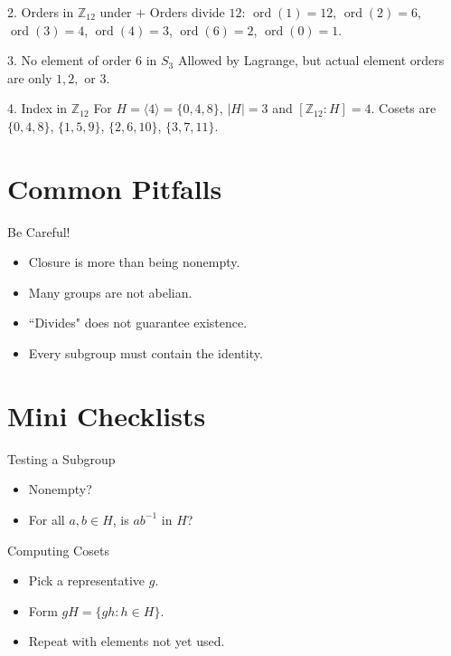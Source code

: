 \documentclass[12pt]{article}
\begin{document}
\begin{examplebox}{2. Orders in $\mathbb{Z}_{12}$ under $+$}
Orders divide $12$: $\operatorname{ord}(1)=12$, $\operatorname{ord}(2)=6$, $\operatorname{ord}(3)=4$, $\operatorname{ord}(4)=3$, $\operatorname{ord}(6)=2$, $\operatorname{ord}(0)=1$.
\end{examplebox}

\begin{examplebox}{3. No element of order $6$ in $S_3$}
Allowed by Lagrange, but actual element orders are only $1,2,$ or $3$.
\end{examplebox}

\begin{examplebox}{4. Index in $\mathbb{Z}_{12}$}
For $H=\langle4\rangle=\{0,4,8\}$, $|H|=3$ and $[\mathbb{Z}_{12}:H]=4$. Cosets are $\{0,4,8\}$, $\{1,5,9\}$, $\{2,6,10\}$, $\{3,7,11\}$.
\end{examplebox}

\section*{Common Pitfalls}
\begin{warnbox}{Be Careful!}
\begin{itemize}
  \item Closure is more than being nonempty.
  \item Many groups are not abelian.
  \item ``Divides" does not guarantee existence.
  \item Every subgroup must contain the identity.
\end{itemize}
\end{warnbox}

\section*{Mini Checklists}
\begin{examplebox}{Testing a Subgroup}
\begin{itemize}
  \item Nonempty?
  \item For all $a,b\in H$, is $ab^{-1}$ in $H$?
\end{itemize}
\end{examplebox}

\begin{examplebox}{Computing Cosets}
\begin{itemize}
  \item Pick a representative $g$.
  \item Form $gH=\{gh:h\in H\}$.
  \item Repeat with elements not yet used.
\end{itemize}
\end{examplebox}
\end{document}
